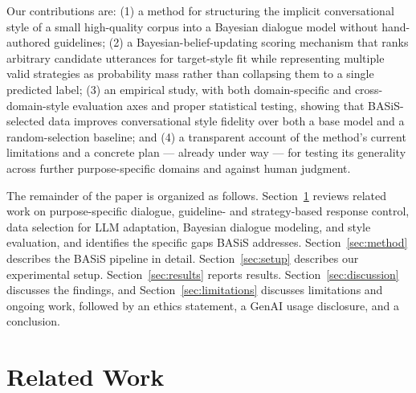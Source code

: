 \documentclass[manuscript,review,anonymous]{acmart}
\begin{document}
Our contributions are: (1) a method for structuring the implicit conversational style of a small high-quality corpus into a Bayesian dialogue model without hand-authored guidelines; (2) a Bayesian-belief-updating scoring mechanism that ranks arbitrary candidate utterances for target-style fit while representing multiple valid strategies as probability mass rather than collapsing them to a single predicted label; (3) an empirical study, with both domain-specific and cross-domain-style evaluation axes and proper statistical testing, showing that BASiS-selected data improves conversational style fidelity over both a base model and a random-selection baseline; and (4) a transparent account of the method's current limitations and a concrete plan --- already under way --- for testing its generality across further purpose-specific domains and against human judgment.

The remainder of the paper is organized as follows. Section~\ref{sec:relwork} reviews related work on purpose-specific dialogue, guideline- and strategy-based response control, data selection for LLM adaptation, Bayesian dialogue modeling, and style evaluation, and identifies the specific gaps BASiS addresses. Section~\ref{sec:method} describes the BASiS pipeline in detail. Section~\ref{sec:setup} describes our experimental setup. Section~\ref{sec:results} reports results. Section~\ref{sec:discussion} discusses the findings, and Section~\ref{sec:limitations} discusses limitations and ongoing work, followed by an ethics statement, a GenAI usage disclosure, and a conclusion.


\section{Related Work}
\label{sec:relwork}
\end{document}
